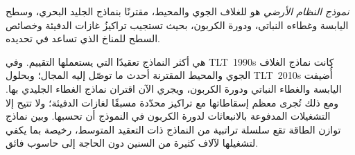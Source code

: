 \begin{omfigure}
\par{}\label{fig:b3:climate-models:grid}
\end{omfigure}

\begin{definition}\label{def:b3:climate-models:esm}
\emph{نموذج النظام الأرضي}  هو  للغلاف الجوي والمحيط، مقترنًا بنماذج
الجليد البحري، وسطح اليابسة وغطاءه النباتي، ودورة الكربون، بحيث
تستجيب تراكيزُ غازات الدفيئة وخصائص السطح للمناخ
الذي تساعد في تحديده.
\end{definition}

 هي أكثر النماذج تعقيدًا التي يستعملها التقييم. وفي
\mbox{\textdir TLT 1990s} كانت نماذج الغلاف الجوي والمحيط المقترنة أحدث ما توصّل إليه المجال؛
وبحلول \mbox{\textdir TLT 2010s} أُضيفت اليابسة والغطاء النباتي ودورة الكربون، ويجري
الآن اقتران نماذج الغطاء الجليدي بها. ومع ذلك تُجرى معظم إسقاطاتها
مع تراكيز محدّدة مسبقًا لغازات الدفيئة؛
ولا تتيح إلا التشغيلات المدفوعة بالانبعاثات لدورة الكربون في النموذج أن تحسبها.
وبين نماذج توازن الطاقة  تقع سلسلة تراتبية من النماذج
ذات التعقيد المتوسط، رخيصة بما يكفي لتشغيلها لآلاف كثيرة من
السنين دون الحاجة إلى حاسوب فائق.

